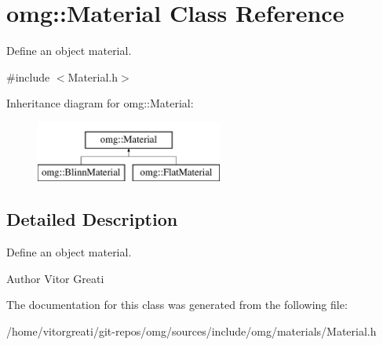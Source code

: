 \hypertarget{classomg_1_1_material}{}\section{omg\+::Material Class Reference}
\label{classomg_1_1_material}


Define an object material.  




{\ttfamily \#include $<$Material.\+h$>$}

Inheritance diagram for omg\+::Material\+:\begin{figure}[H]
\begin{center}
\leavevmode
\includegraphics[height=2.000000cm]{classomg_1_1_material}
\end{center}
\end{figure}


\subsection{Detailed Description}
Define an object material. 

\begin{DoxyAuthor}{Author}
Vitor Greati 
\end{DoxyAuthor}


The documentation for this class was generated from the following file\+:\begin{DoxyCompactItemize}
\item 
/home/vitorgreati/git-\/repos/omg/sources/include/omg/materials/Material.\+h\end{DoxyCompactItemize}
